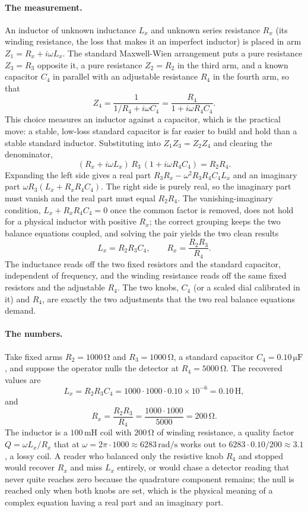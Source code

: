 \paragraph{The measurement.} An inductor of unknown inductance $L_x$
and unknown series resistance $R_x$ (its winding resistance, the loss
that makes it an imperfect inductor) is placed in arm $Z_1 = R_x +
i\omega L_x$. The standard Maxwell-Wien arrangement puts a pure
resistance $Z_3 = R_3$ opposite it, a pure resistance $Z_2 = R_2$ in
the third arm, and a known capacitor $C_4$ in parallel with an
adjustable resistance $R_4$ in the fourth arm, so that
\[
Z_4 = \frac{1}{1/R_4 + i\omega C_4}
= \frac{R_4}{1 + i\omega R_4 C_4}.
\]
This choice measures an inductor against a capacitor, which is the
practical move: a stable, low-loss standard capacitor is far easier to
build and hold than a stable standard inductor. Substituting into
$Z_1 Z_3 = Z_2 Z_4$ and clearing the denominator,
\[
(R_x + i\omega L_x)\,R_3\,(1 + i\omega R_4 C_4) = R_2 R_4.
\]
Expanding the left side gives a real part $R_3 R_x - \omega^{2} R_3 R_4
C_4 L_x$ and an imaginary part $\omega R_3 (L_x + R_x R_4 C_4)$. The
right side is purely real, so the imaginary part must vanish and the
real part must equal $R_2 R_4$. The vanishing-imaginary condition,
$L_x + R_x R_4 C_4 = 0$ once the common factor is removed, does not
hold for a physical inductor with positive $R_x$; the correct grouping
keeps the two balance equations coupled, and solving the pair yields
the two clean results
\[
L_x = R_2 R_3 C_4, \qquad
R_x = \frac{R_2 R_3}{R_4}.
\]
The inductance reads off the two fixed resistors and the standard
capacitor, independent of frequency, and the winding resistance reads
off the same fixed resistors and the adjustable $R_4$. The two knobs,
$C_4$ (or a scaled dial calibrated in it) and $R_4$, are exactly the
two adjustments that the two real balance equations demand.

\paragraph{The numbers.} Take fixed arms $R_2 = 1000\,\si{\ohm}$ and
$R_3 = 1000\,\si{\ohm}$, a standard capacitor $C_4 = 0.10\,\si{\micro
\farad}$, and suppose the operator nulls the detector at $R_4 =
5000\,\si{\ohm}$. The recovered values are
\[
L_x = R_2 R_3 C_4 = 1000 \cdot 1000 \cdot 0.10 \times 10^{-6}
= 0.10\,\si{\henry},
\]
and
\[
R_x = \frac{R_2 R_3}{R_4} = \frac{1000 \cdot 1000}{5000} = 200\,\si{\ohm}.
\]
The inductor is a $100\,\si{\milli\henry}$ coil with $200\,\si{\ohm}$
of winding resistance, a quality factor $Q = \omega L_x / R_x$ that at
$\omega = 2\pi \cdot 1000 \approx 6283\,\si{\radian\per\second}$ works
out to $6283 \cdot 0.10 / 200 \approx 3.1$, a lossy coil. A reader who
balanced only the resistive knob $R_4$ and stopped would recover $R_x$
and miss $L_x$ entirely, or would chase a detector reading that never
quite reaches zero because the quadrature component remains; the null
is reached only when both knobs are set, which is the physical meaning
of a complex equation having a real part and an imaginary part.

